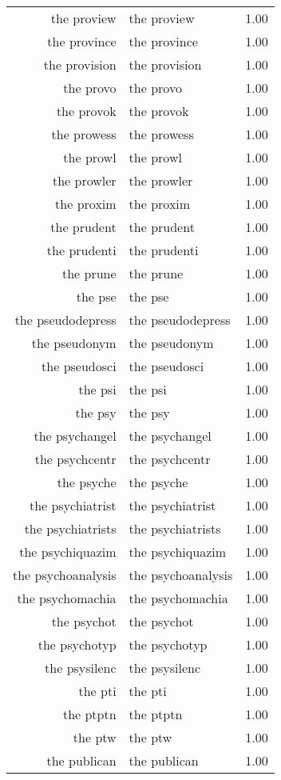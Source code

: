 \begin{table}[ht]
\begin{tabular}{rlr}
  the proview & the proview & 1.00 \\ 
  the province & the province & 1.00 \\ 
  the provision & the provision & 1.00 \\ 
  the provo & the provo & 1.00 \\ 
  the provok & the provok & 1.00 \\ 
  the prowess & the prowess & 1.00 \\ 
  the prowl & the prowl & 1.00 \\ 
  the prowler & the prowler & 1.00 \\ 
  the proxim & the proxim & 1.00 \\ 
  the prudent & the prudent & 1.00 \\ 
  the prudenti & the prudenti & 1.00 \\ 
  the prune & the prune & 1.00 \\ 
  the pse & the pse & 1.00 \\ 
  the pseudodepress & the pseudodepress & 1.00 \\ 
  the pseudonym & the pseudonym & 1.00 \\ 
  the pseudosci & the pseudosci & 1.00 \\ 
  the psi & the psi & 1.00 \\ 
  the psy & the psy & 1.00 \\ 
  the psychangel & the psychangel & 1.00 \\ 
  the psychcentr & the psychcentr & 1.00 \\ 
  the psyche & the psyche & 1.00 \\ 
  the psychiatrist & the psychiatrist & 1.00 \\ 
  the psychiatrists & the psychiatrists & 1.00 \\ 
  the psychiquazim & the psychiquazim & 1.00 \\ 
  the psychoanalysis & the psychoanalysis & 1.00 \\ 
  the psychomachia & the psychomachia & 1.00 \\ 
  the psychot & the psychot & 1.00 \\ 
  the psychotyp & the psychotyp & 1.00 \\ 
  the psysilenc & the psysilenc & 1.00 \\ 
  the pti & the pti & 1.00 \\ 
  the ptptn & the ptptn & 1.00 \\ 
  the ptw & the ptw & 1.00 \\ 
  the publican & the publican & 1.00 \\ 

\end{tabular}
\end{table}
